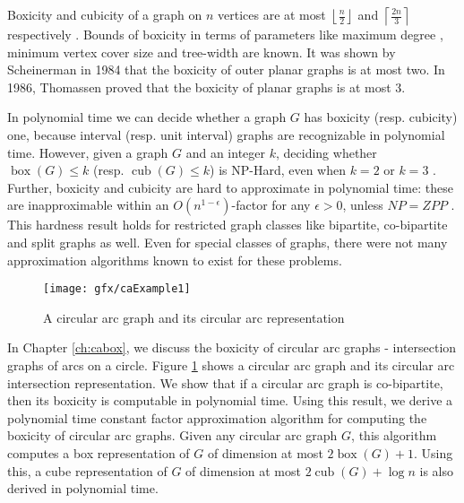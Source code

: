 Boxicity and cubicity of a graph on $n$ vertices are at most $\left \lfloor\frac{n}{2} \right \rfloor$ 
and $\left \lceil\frac{2 n}{3} \right \rceil$ respectively \cite{Rob1}.  
Bounds of boxicity in terms of parameters like maximum degree \cite{Esperet09,AdigaCOCOON}, minimum vertex cover size \cite{SUCVC} and tree-width
\cite{Chandran2007} are known. It was shown by Scheinerman \cite{Sch1} in 1984 that the boxicity of outer planar graphs is at most two. 
In 1986, Thomassen \cite{Thom1} proved that the boxicity of planar graphs is at most 3. 

In polynomial time we can decide whether a graph $G$ has boxicity (resp. cubicity) one, because interval (resp. unit interval) graphs are recognizable in polynomial time. 
However, given a graph $G$ and an integer $k$, deciding whether $\operatorname{box}(G) \le k$ (resp. $\operatorname{cub}(G) \le k$) is NP-Hard, 
even when $k=2$ or $k=3$ \cite{Coz1,Yan1,Krat1,Breu1998}. 
Further, boxicity and cubicity are hard to approximate in polynomial time: 
these are inapproximable within an $O(n^{1 - \epsilon})$-factor for any $\epsilon >0$, 
unless $NP=ZPP$ \cite{Chalermsook2013}. This hardness result holds for restricted graph classes like 
bipartite, co-bipartite and split graphs as well. 
Even for special classes of graphs, there were not many approximation algorithms known to exist for these problems. 

\begin{figure}
\begin{center}
\texttt{[image: gfx/caExample1]}
\caption{A circular arc graph and its circular arc representation}
\label{FigcaExample1}
\end{center}
\end{figure}

In Chapter \ref{ch:cabox}, we discuss the boxicity of circular arc graphs - intersection graphs of arcs on a circle.  
Figure \ref{FigcaExample1} shows a circular arc graph and its circular arc intersection representation.   
We show that if a circular arc graph is co-bipartite, then its boxicity is computable in polynomial time. 
Using this result, we derive a polynomial time constant factor approximation algorithm for computing the boxicity of circular arc graphs. 
Given any circular arc graph $G$, this algorithm
computes a box representation of $G$ of dimension at most $2 \operatorname{box}(G)+1$. Using this, 
a cube representation of $G$ of dimension at most $2 \operatorname{cub}(G)+\log n$ is also derived in 
polynomial time. 

